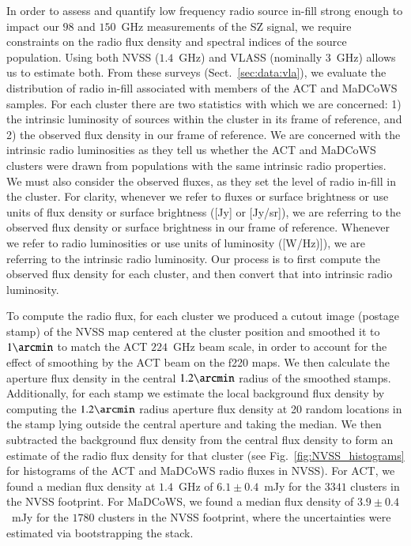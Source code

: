 \documentclass[longauth]{aa} %
\newcommand{\madcows}{MaDCoWS\xspace}
\begin{document}
In order to assess and quantify low frequency radio source in-fill strong enough to impact our $98$ and $150$~GHz measurements of the SZ signal, we require constraints on the radio flux density and spectral indices of the source population. Using both NVSS ($1.4$~GHz) and VLASS (nominally $3$~GHz) allows us to estimate both. 
From these surveys (Sect.~\ref{sec:data:vla}), we evaluate the distribution of radio in-fill associated with members of the ACT and MaDCoWS samples. For each cluster there are two statistics with which we are concerned: 1) the intrinsic luminosity of sources within the cluster in its frame of reference, and 2) the observed flux density in our frame of reference. We are concerned with the intrinsic radio luminosities as they tell us whether the ACT and \madcows clusters were drawn from populations with the same intrinsic radio properties. We must also consider the observed fluxes, as they set the level of radio in-fill in the cluster. For clarity, whenever we refer to fluxes or surface brightness or use units of flux density or surface brightness ([Jy] or [Jy/sr]), we are referring to the observed flux density or surface brightness in our frame of reference. Whenever we refer to radio luminosities or use units of luminosity ([W/Hz)]), we are referring to the intrinsic radio luminosity. Our process is to first compute the observed flux density for each cluster, and then convert that into intrinsic radio luminosity.

To compute the radio flux, for each cluster we produced a cutout image (postage stamp) of the NVSS map centered at the cluster position and smoothed it to $1\arcmin$ to match the ACT $224$~GHz beam scale, in order to account for the effect of smoothing by the ACT beam on the f220 maps. We then calculate the aperture flux density in the central $1.2\arcmin$ radius of the smoothed stamps. Additionally, for each stamp we estimate the local background flux density by computing the $1.2\arcmin$ radius aperture flux density at 20 random locations in the stamp lying outside the central aperture and taking the median. We then subtracted the background flux density from the central flux density to form an estimate of the radio flux density for that cluster (see Fig.~\ref{fig:NVSS_histograms} for histograms of the ACT and MaDCoWS radio fluxes in NVSS). For ACT, we found a median flux density at $1.4$~GHz of $6.1\pm 0.4$~mJy for the $3341$ clusters in the NVSS footprint. For MaDCoWS, we found a median flux density of $3.9\pm 0.4$~mJy for the $1780$ clusters in the NVSS footprint, where the uncertainties were estimated via bootstrapping the stack. 
\end{document}
